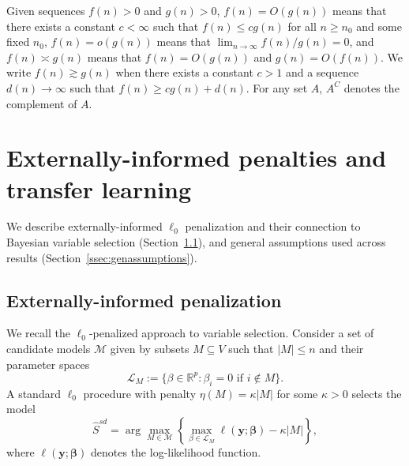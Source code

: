 \documentclass[
  12pt]{article}
\newcommand{\R}{\mathbb{R}}
\newcommand{\M}{\mathcal{M}}
\newcommand{\by}{\mathbf{y}}
\newcommand{\bbeta}{\boldsymbol{\beta}}
\begin{document}
Given sequences $f(n) > 0$ and $g(n) >0$, $f(n)=O(g(n))$ means that there exists a constant $c<\infty$ such that $f(n) \leq c g(n)$ for all $n \geq n_0$ and some fixed $n_0$, $f(n)=o(g(n))$ means that $\lim_{n\to\infty}f(n)/g(n)=0$, and $f(n)\asymp g(n)$ means that $f(n) = O(g(n))$ and $g(n) = O(f(n))$. We write $f(n) \gtrsim g(n)$ when there exists a constant $c>1$ and a sequence $d(n)\to\infty$ such that $f(n) \geq c g(n)+d(n)$. For any set $A$, $A^C$ denotes the complement of $A$.

\section{Externally-informed penalties and transfer learning}\label{sec:intro_blockpen} 

We describe externally-informed $\ell_0$ penalization and their connection to Bayesian variable selection (Section~\ref{ssec:intro_blockpen}), and general assumptions used across results (Section~\ref{ssec:genassumptions}).

\subsection{Externally-informed penalization}\label{ssec:intro_blockpen}

We recall the $\ell_0$-penalized approach to variable selection. Consider a set of candidate models $\M$ given by subsets $M\subseteq V$ such that $|M|\leq n$ and their parameter spaces
\[
\mathcal{L}_M := \{\beta\in \R^p: \beta_i=0 \text{ if } i\notin M\}.
\]
A standard $\ell_0$ procedure with penalty $\eta(M)=\kappa |M|$ for some $\kappa>0$ selects the model
\begin{equation}\label{eq:stdl0}
\hat{S}^{sd}= \arg\max_{M\in \M} \left\{\max_{\beta\in \mathcal{L}_M}\ell(\by; \bbeta)-\kappa |M|\right\},
\end{equation}
where $\ell(\by; \bbeta)$ denotes the log-likelihood function. 
\end{document}
